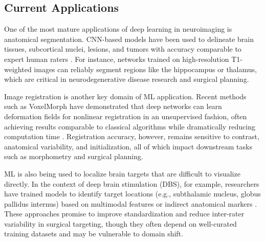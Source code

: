 \subsection{Current Applications}
One of the most mature applications of deep learning in neuroimaging is anatomical segmentation. CNN-based models have been used to delineate brain tissues, subcortical nuclei, lesions, and tumors with accuracy comparable to expert human raters \cite{dolz2018denseunet}. For instance, networks trained on high-resolution T1-weighted images can reliably segment regions like the hippocampus or thalamus, which are critical in neurodegenerative disease research and surgical planning.

Image registration is another key domain of ML application. Recent methods such as VoxelMorph have demonstrated that deep networks can learn deformation fields for nonlinear registration in an unsupervised fashion, often achieving results comparable to classical algorithms while dramatically reducing computation time \cite{balakrishnan2019voxelmorph}. Registration accuracy, however, remains sensitive to contrast, anatomical variability, and initialization, all of which impact downstream tasks such as morphometry and surgical planning.

ML is also being used to localize brain targets that are difficult to visualize directly. In the context of deep brain stimulation (DBS), for example, researchers have trained models to identify target locations (e.g., subthalamic nucleus, globus pallidus internus) based on multimodal features or indirect anatomical markers \cite{yang2020deep}. These approaches promise to improve standardization and reduce inter-rater variability in surgical targeting, though they often depend on well-curated training datasets and may be vulnerable to domain shift.